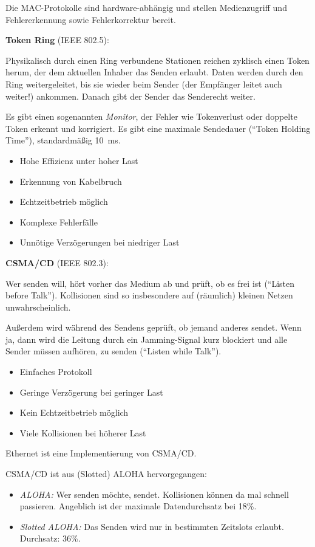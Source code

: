 \documentclass[a4paper,parskip=half*,DIV=15,fontsize=11pt]{scrartcl}
\newcommand\pro{\item[$+$]}
\newcommand\con{\item[$-$]}
\begin{document}
Die MAC-Protokolle sind hardware-abhängig und stellen Medienzugriff und Fehlererkennung sowie Fehlerkorrektur bereit.

\begin{minipage}[t]{0.45\textwidth}
\textbf{Token Ring} (IEEE 802.5):

Physikalisch durch einen Ring verbundene Stationen reichen zyklisch einen Token herum, der dem aktuellen Inhaber das Senden erlaubt. Daten werden durch den Ring weitergeleitet, bis sie wieder beim Sender (der Empfänger leitet auch weiter!) ankommen. Danach gibt der Sender das Senderecht weiter.

Es gibt einen sogenannten \emph{Monitor}, der Fehler wie Tokenverlust oder doppelte Token erkennt und korrigiert. Es gibt eine maximale Sendedauer (``Token Holding Time''), standardmäßig \SI{10}{\ms}.

\begin{itemize}
    \itemsep0em
    \pro Hohe Effizienz unter hoher Last
    \pro Erkennung von Kabelbruch
    \pro Echtzeitbetrieb möglich
    \con Komplexe Fehlerfälle
    \con Unnötige Verzögerungen bei niedriger Last
\end{itemize}
\end{minipage}\hspace{0.05\textwidth}
\begin{minipage}[t]{0.45\textwidth}
\textbf{CSMA/CD} (IEEE 802.3):

Wer senden will, hört vorher das Medium ab und prüft, ob es frei ist (``Listen before Talk''). Kollisionen sind so insbesondere auf (räumlich) kleinen Netzen unwahrscheinlich.

Außerdem wird während des Sendens geprüft, ob jemand anderes sendet. Wenn ja, dann wird die Leitung durch ein Jamming-Signal kurz blockiert und alle Sender müssen aufhören, zu senden (``Listen while Talk'').

\begin{itemize}
    \itemsep0em
    \pro Einfaches Protokoll
    \pro Geringe Verzögerung bei geringer Last
    \con Kein Echtzeitbetrieb möglich
    \con Viele Kollisionen bei höherer Last
\end{itemize}

Ethernet ist eine Implementierung von CSMA/CD.
\end{minipage}

\medskip

CSMA/CD ist aus (Slotted) ALOHA hervorgegangen:
\begin{itemize}
\item \emph{ALOHA:} Wer senden möchte, sendet. Kollisionen können da mal schnell passieren. Angeblich ist der maximale Datendurchsatz bei 18\%.
\item \emph{Slotted ALOHA:} Das Senden wird nur in bestimmten Zeitslots erlaubt. Durchsatz: 36\%.
\end{itemize}
\end{document}
